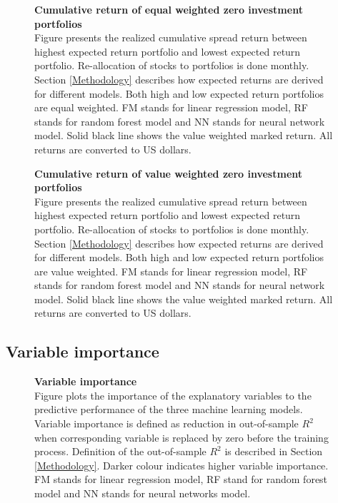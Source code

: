 \documentclass{article}
\begin{document}
\begin{figure}[ht]
\centering
\caption[Cumulative return of equal weighted zero investment portfolios]{\textbf{Cumulative return of equal weighted zero investment portfolios}\\ Figure presents the realized cumulative spread return between highest expected return portfolio and lowest expected return portfolio. Re-allocation of stocks to portfolios is done monthly. Section \ref{Methodology} describes how expected returns are derived for different models. Both high and low expected return portfolios are equal weighted. FM stands for linear regression model, RF stands for random forest model and NN stands for neural network model. Solid black line shows the value weighted marked return. All returns are converted to US dollars.}

\label{plot:cumul_ew_LS_portf_return}
\end{figure}

\begin{figure}[ht]
\centering
\caption[Cumulative return of value weighted zero investment portfolios]{\textbf{Cumulative return of value weighted zero investment portfolios}\\ Figure presents the realized cumulative spread return between highest expected return portfolio and lowest expected return portfolio. Re-allocation of stocks to portfolios is done monthly. Section \ref{Methodology} describes how expected returns are derived for different models. Both high and low expected return portfolios are value weighted. FM stands for linear regression model, RF stands for random forest model and NN stands for neural network model. Solid black line shows the value weighted marked return. All returns are converted to US dollars.}

\label{plot:cumul_vw_LS_portf_return}
\end{figure}

\subsection{Variable importance}\label{VariableImportance}

\begin{figure}[ht]
\centering
\caption[Variable importance]{\textbf{Variable importance}\\ Figure plots the importance of the explanatory variables to the predictive performance of the three machine learning models. Variable importance is defined as reduction in out-of-sample $R^2$ when corresponding variable is replaced by zero before the training process. Definition of the out-of-sample $R^2$ is described in Section \ref{Methodology}. Darker colour indicates higher variable importance. FM stands for linear regression model, RF stand for random forest model and NN stands for neural networks model.}

\label{plot:combined_VI}
\end{figure}
\end{document}

